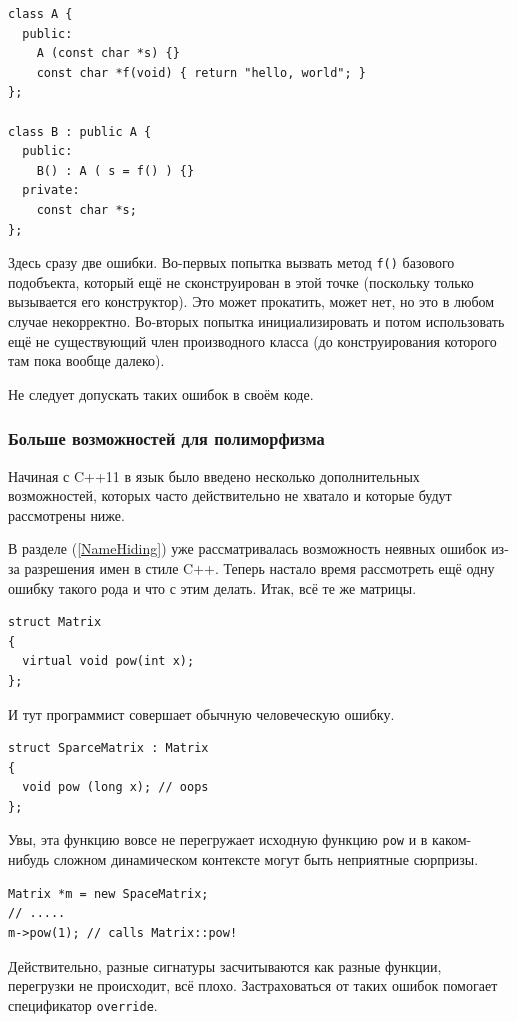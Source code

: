 \documentclass[a4paper,12pt,oneside]{article}
\begin{document}
\begin{lstlisting}
class A {
  public:
    A (const char *s) {}
    const char *f(void) { return "hello, world"; }
};

class B : public A {
  public:
    B() : A ( s = f() ) {}
  private:
    const char *s;
};
\end{lstlisting}

Здесь сразу две ошибки. Во-первых попытка вызвать метод \lstinline!f()! базового подобъекта, который ещё не сконструирован в этой точке (поскольку только вызывается его конструктор). Это может прокатить, может нет, но это в любом случае некорректно. Во-вторых попытка инициализировать и потом использовать ещё не существующий член производного класса (до конструирования которого там пока вообще далеко).

Не следует допускать таких ошибок в своём коде.

\subsubsection{Больше возможностей для полиморфизма}\label{NewVirtual}

Начиная с C++11 в язык было введено несколько дополнительных возможностей, которых часто действительно не хватало и которые будут рассмотрены ниже.

В разделе (\ref{NameHiding}) уже рассматривалась возможность неявных ошибок из-за разрешения имен в стиле C++. Теперь настало время рассмотреть ещё одну ошибку такого рода и что с этим делать. Итак, всё те же матрицы.

\begin{lstlisting}
struct Matrix
{
  virtual void pow(int x);
};
\end{lstlisting}

И тут программист совершает обычную человеческую ошибку.

\begin{lstlisting}
struct SparceMatrix : Matrix
{
  void pow (long x); // oops
};
\end{lstlisting}

Увы, эта функцию вовсе не перегружает исходную функцию \lstinline!pow! и в каком-нибудь сложном динамическом контексте могут быть неприятные сюрпризы. 

\begin{lstlisting}
Matrix *m = new SpaceMatrix;
// .....
m->pow(1); // calls Matrix::pow!
\end{lstlisting}

Действительно, разные сигнатуры засчитываются как разные функции, перегрузки не происходит, всё плохо. Застраховаться от таких ошибок помогает спецификатор \lstinline!override!.
\end{document}
